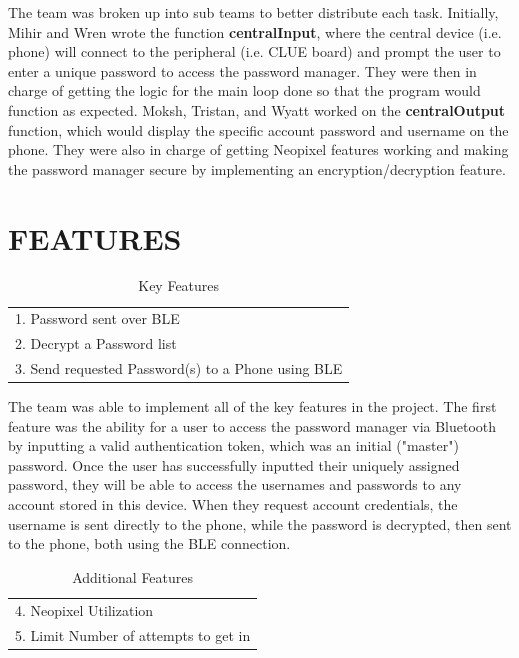 \documentclass[12pt]{article}
\begin{document}
\hspace{1cm}The team was broken up into sub teams to better distribute each task. Initially, Mihir and Wren wrote the function \textbf{centralInput}, where the central device (i.e. phone) will connect to the peripheral (i.e. CLUE board) and prompt the user to enter a unique password to access the password manager. They were then in charge of getting the logic for the main loop done so that the program would function as expected. Moksh, Tristan, and Wyatt worked on the \textbf{centralOutput} function, which would display the specific account password and username on the phone. They were also in charge of getting Neopixel features working and making the password manager secure by implementing an encryption/decryption feature.


\section{FEATURES}
\begin{table}[ht]
    \caption{ Key Features}
    \label{table:reqFeatures1}
    \begin{center}
        \begin{tabular}{|l|}
            \hline
            1. Password sent over BLE \\
            2. Decrypt a Password list \\
            3. Send requested Password(s) to a Phone using BLE \\
            \hline
        \end{tabular}
    \end{center}
\end{table}

\hspace{1cm}The team was able to implement all of the key features in the project. The first feature was the ability for a user to access the password manager via Bluetooth by inputting a valid authentication token, which was an initial ("master") password. Once the user has successfully inputted their uniquely assigned password, they will be able to access the usernames and passwords to any account stored in this device. When they request account credentials, the username is sent directly to the phone, while the password is decrypted, then sent to the phone, both using the BLE connection.

\begin{table}[ht]
    \caption{ Additional Features}
    \label{table:reqFeatures2}
    \begin{center}
        \begin{tabular}{|l|}
            \hline
            4. Neopixel Utilization \\
            5. Limit Number of attempts to get in \\
            \hline
        \end{tabular}
    \end{center}
\end{table}
\end{document}
